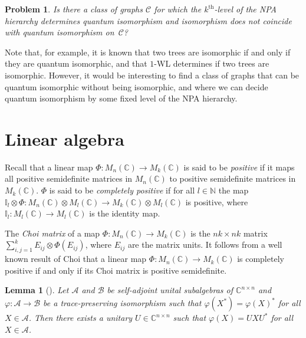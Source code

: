 \documentclass[11pt,a4paper]{article}
\theoremstyle{plain}
\newtheorem{lem}[thm]{Lemma}
\newtheorem{prob}[thm]{Problem}
\theoremstyle{remark}
\theoremstyle{definition}
\newcommand{\complex}{\mathbb{C}}
\def\calA{{\mathcal A}} \def\calB{{\mathcal B}} \def\calC{{\mathcal C}}
\begin{document}
\begin{prob}
  Is there a class of graphs $\mathcal{C}$ for which the $k^{\text{th}}$-level of the NPA hierarchy determines quantum isomorphism and isomorphism does not coincide with quantum isomorphism on~$\mathcal{C}$?
\end{prob}

Note that, for example, it is known that two trees are isomorphic if and only if they are quantum isomorphic, and that $1$-WL determines if two trees are isomorphic. However, it would be interesting to find a class of graphs that can be quantum isomorphic without being isomorphic, and where we can decide quantum isomorphism by some fixed level of the NPA hierarchy.  




\appendix

\newpage

\section{Linear algebra}\label{app:linalg}

Recall that a linear map $\Phi: M_n(\mathbb{C}) \to M_k(\mathbb{C})$ is said to be \emph{positive} if it maps all positive semidefinite matrices in $M_n(\mathbb{C})$ to positive semidefinite matrices in $M_k(\mathbb{C})$. $\Phi$ is said to be \emph{completely positive} if for all $l \in \mathbb{N}$ the map $\mathbb{I}_l \otimes \Phi : M_n(\complex) \otimes M_l(\complex) \to M_k(\complex) \otimes M_l(\complex)$ is positive, where $\mathbb{I}_l: M_l(\mathbb{C}) \to M_l(\complex)$ is the identity map. 

The \emph{Choi matrix} of a map $\Phi: M_n(\mathbb{C}) \to M_k(\mathbb{C})$ is the $nk \times nk$ matrix $\sum_{i,j = 1}^k E_{ij}\otimes \Phi(E_{ij})$, where $E_{ij}$ are the matrix units. It follows from a well known result of Choi \cite{CHOI1975285} that a linear map $\Phi: M_n(\mathbb{C}) \to M_k(\mathbb{C})$ is completely positive if and only if its Choi matrix is positive semidefinite. 

\begin{lem}[{\cite[Lemma A.1]{david_mathprog}}]
  \label{lem:linalg_unitary}
  Let $\calA$ and $\calB$ be self-adjoint unital subalgebras of $\complex^{n\times n}$ and $\varphi\colon \calA \to \calB$ be a trace-preserving isomorphism such that $\varphi(X^*) = \varphi(X)^*$ for all $X\in\calA$.
  Then there exists a unitary $U \in \complex^{n\times n}$ such that $\varphi(X) = UXU^*$ for all $X\in\calA$.
\end{lem}
\end{document}
